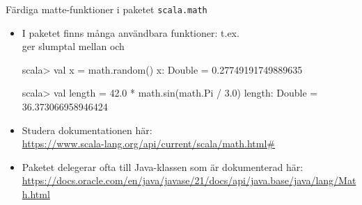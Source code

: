\begin{Slide}{Färdiga matte-funktioner i paketet \texttt{scala.math}}\SlideFontSmall
\begin{itemize}
\item I paketet \texttt{} finns många användbara funktioner: t.ex.\\
 ger slumptal mellan  och 
\begin{REPLnonum}
scala> val x = math.random()
x: Double = 0.27749191749889635

scala> val length = 42.0 * math.sin(math.Pi / 3.0)
length: Double = 36.373066958946424
\end{REPLnonum}

\item Studera dokumentationen här: \\{\SlideFontTiny
\url{https://www.scala-lang.org/api/current/scala/math.html#}}

\item Paketet  delegerar ofta till Java-klassen \texttt{} som är dokumenterad här: \\{\SlideFontTiny
\url{https://docs.oracle.com/en/java/javase/21/docs/api/java.base/java/lang/Math.html}}

\end{itemize}
\end{Slide}




